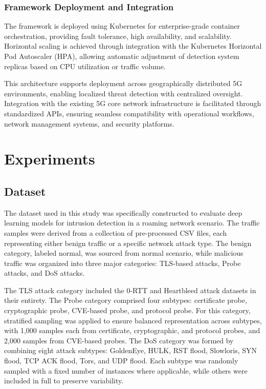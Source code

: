 \documentclass[journal,article,submit,moreauthors,pdftex]{Definitions/tsp}
\begin{document}
\subsubsection{Framework Deployment and Integration}

The framework is deployed using Kubernetes for enterprise-grade container orchestration, providing fault tolerance, high availability, and scalability. Horizontal scaling is achieved through integration with the Kubernetes Horizontal Pod Autoscaler (HPA), allowing automatic adjustment of detection system replicas based on CPU utilization or traffic volume.

This architecture supports deployment across geographically distributed 5G environments, enabling localized threat detection with centralized oversight. Integration with the existing 5G core network infrastructure is facilitated through standardized APIs, ensuring seamless compatibility with operational workflows, network management systems, and security platforms.


\section{Experiments}

\subsection{Dataset}
The dataset used in this study was specifically constructed to evaluate deep learning models for intrusion detection in a roaming network scenario. The traffic samples were derived from a collection of pre-processed CSV files, each representing either benign traffic or a specific network attack type. The benign category, labeled normal, was sourced from normal scenario, while malicious traffic was organized into three major categories: TLS-based attacks, Probe attacks, and DoS attacks.

The TLS attack category included the 0-RTT and Heartbleed attack datasets in their entirety. The Probe category comprised four subtypes: certificate probe, cryptographic probe, CVE-based probe, and protocol probe. For this category, stratified sampling was applied to ensure balanced representation across subtypes, with 1,000 samples each from certificate, cryptographic, and protocol probes, and 2,000 samples from CVE-based probes. The DoS category was formed by combining eight attack subtypes: GoldenEye, HULK, RST flood, Slowloris, SYN flood, TCP ACK flood, Tors, and UDP flood. Each subtype was randomly sampled with a fixed number of instances where applicable, while others were included in full to preserve variability.
\end{document}
